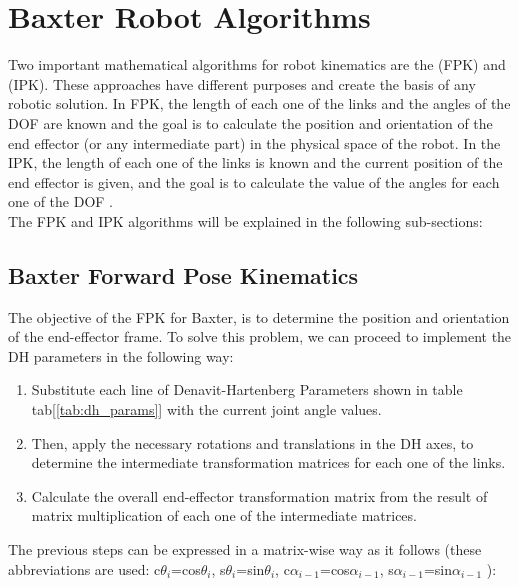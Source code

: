 \documentclass[11pt]{report} %
\begin{document}
\section{Baxter Robot Algorithms}

Two important mathematical algorithms for robot kinematics are the  (FPK) and  (IPK). These approaches have different purposes and create the basis of any robotic solution. In FPK, the length of each one of the links and the angles of the DOF are known and the goal is to calculate the position and orientation of the end effector (or any intermediate part) in the physical space of the robot. In the IPK, the length of each one of the links is known and the current position of the end effector is given, and the goal is to calculate the value of the angles for each one of the DOF \citep{cite_fpk_and_ipk_explained_simple}.\\

The FPK and IPK algorithms will be explained in the following sub-sections:

\subsection{Baxter Forward Pose Kinematics}

The objective of the FPK for Baxter, is to determine the position and orientation of the end-effector frame. To solve this problem, we can proceed to implement the DH parameters in the following way:

\begin{enumerate}
    \item Substitute each line of Denavit-Hartenberg Parameters shown in table tab[\ref{tab:dh_params}] with the current joint angle values.
    \item Then, apply the necessary rotations and translations in the DH axes, to determine the intermediate transformation matrices for each one of the links.
    \item Calculate the overall end-effector transformation matrix from the result of matrix multiplication of each one of the intermediate matrices. 
\end{enumerate}

The previous steps can be expressed in a matrix-wise way as it follows (these abbreviations are used: c$\theta_{i}$=cos$\theta_{i}$, s$\theta_{i}$=sin$\theta_{i}$, c$\alpha_{i-1}$=cos$\alpha_{i-1}$, s$\alpha_{i-1}$=sin$\alpha_{i-1}$ ):
\end{document}
